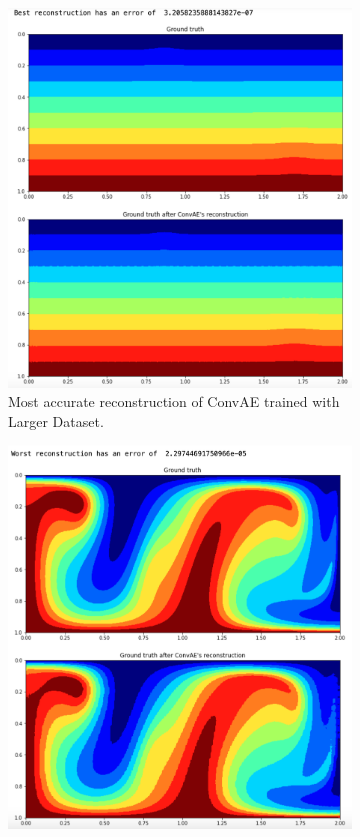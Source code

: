 \begin{figure}[H]
\centering
\begin{subfigure}{0.45\textwidth}
    \includegraphics[width=\textwidth]{figures/mantle_convection_images/larger_dataset/ConvAE_Best.png}
    \caption{Most accurate reconstruction of ConvAE trained with Larger Dataset.}
\end{subfigure}
\hfill
\begin{subfigure}{0.45\textwidth}
    \includegraphics[width=\textwidth]{figures/mantle_convection_images/larger_dataset/ConvAE_Worst.png}

\end{subfigure}
\end{figure}
